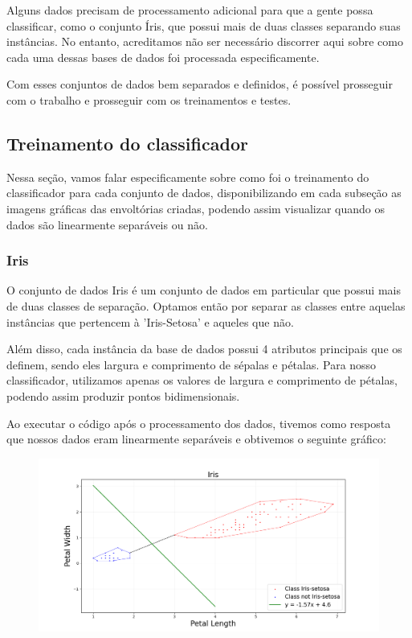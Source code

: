 \documentclass{article}
\begin{document}
Alguns dados precisam de processamento adicional para que a gente possa classificar, como o conjunto Íris, que possui mais de duas classes separando suas instâncias. No entanto, acreditamos não ser necessário discorrer aqui sobre como cada uma dessas bases de dados foi processada especificamente.

Com esses conjuntos de dados bem separados e definidos, é possível prosseguir com o trabalho e prosseguir com os treinamentos e testes.

\subsection{Treinamento do classificador}

Nessa seção, vamos falar especificamente sobre como foi o treinamento do classificador para cada conjunto de dados, disponibilizando em cada subseção as imagens gráficas das envoltórias criadas, podendo assim visualizar quando os dados são linearmente separáveis ou não.

\subsubsection{Iris}

O conjunto de dados Iris é um conjunto de dados em particular que possui mais de duas classes de separação. Optamos então por separar as classes entre aquelas instâncias que pertencem à 'Iris-Setosa' e aqueles que não.

Além disso, cada instância da base de dados possui 4 atributos principais que os definem, sendo eles largura e comprimento de sépalas e pétalas. Para nosso classificador, utilizamos apenas os valores de largura e comprimento de pétalas, podendo assim produzir pontos bidimensionais.

Ao executar o código após o processamento dos dados, tivemos como resposta que nossos dados eram linearmente separáveis e obtivemos o seguinte gráfico:

\begin{figure} [H]
	\includegraphics[width=12cm]{iris.png}
	\centering
\end{figure}
\end{document}
